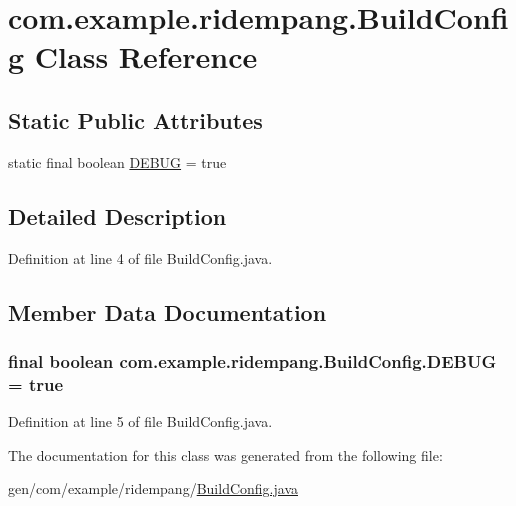 \hypertarget{classcom_1_1example_1_1ridempang_1_1_build_config}{\section{com.\-example.\-ridempang.\-Build\-Config Class Reference}
\label{classcom_1_1example_1_1ridempang_1_1_build_config}
}
\subsection*{Static Public Attributes}
\begin{DoxyCompactItemize}
\item 
static final boolean \hyperlink{classcom_1_1example_1_1ridempang_1_1_build_config_a983fe5424639ffba1f4fce51fb9440f7}{D\-E\-B\-U\-G} = true
\end{DoxyCompactItemize}


\subsection{Detailed Description}


Definition at line 4 of file Build\-Config.\-java.



\subsection{Member Data Documentation}
\hypertarget{classcom_1_1example_1_1ridempang_1_1_build_config_a983fe5424639ffba1f4fce51fb9440f7}{
\subsubsection[{D\-E\-B\-U\-G}]{\setlength{\rightskip}{0pt plus 5cm}final boolean com.\-example.\-ridempang.\-Build\-Config.\-D\-E\-B\-U\-G = true\hspace{0.3cm}{\ttfamily [static]}}}\label{classcom_1_1example_1_1ridempang_1_1_build_config_a983fe5424639ffba1f4fce51fb9440f7}


Definition at line 5 of file Build\-Config.\-java.



The documentation for this class was generated from the following file\-:\begin{DoxyCompactItemize}
\item 
gen/com/example/ridempang/\hyperlink{_build_config_8java}{Build\-Config.\-java}\end{DoxyCompactItemize}
